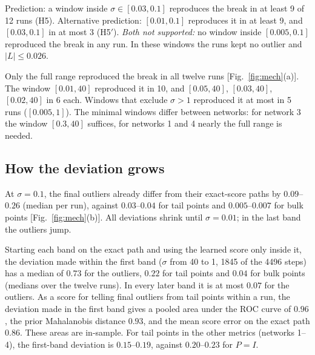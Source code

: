 \begin{test}
\label{test:h5}
Prediction: a window inside $\sigma\in[0.03,0.1]$ reproduces the break in at least 9 of 12 runs (H5).
Alternative prediction: $[0.01,0.1]$ reproduces it in at least 9, and $[0.03,0.1]$ in at most 3 (H5$'$).
\emph{Both not supported:} no window inside $[0.005,0.1]$ reproduced the break in any run.
In these windows the runs kept no outlier and $|L|\leq0.026$.
\end{test}

\begin{observation}
\label{obs:windows}
Only the full range reproduced the break in all twelve runs [Fig.~\ref{fig:mech}(a)].
The window $[0.01,40]$ reproduced it in 10, and $[0.05,40]$, $[0.03,40]$, $[0.02,40]$ in 6 each.
Windows that exclude $\sigma>1$ reproduced it at most in 5 runs ($[0.005,1]$).
The minimal windows differ between networks: for network 3 the window $[0.3,40]$ suffices, for networks 1 and 4 nearly the full range is needed.
\end{observation}

\subsection{How the deviation grows}

\begin{observation}
\label{obs:deviation}
At $\sigma=0.1$, the final outliers already differ from their exact-score paths by $0.09$--$0.26$ (median per run), against $0.03$--$0.04$ for tail points and $0.005$--$0.007$ for bulk points [Fig.~\ref{fig:mech}(b)].
All deviations shrink until $\sigma=0.01$; in the last band the outliers jump.
\end{observation}

\begin{observation}
\label{obs:bands}
Starting each band on the exact path and using the learned score only inside it, the deviation made within the first band ($\sigma$ from 40 to 1, 1845 of the 4496 steps) has a median of $0.73$ for the outliers, $0.22$ for tail points and $0.04$ for bulk points (medians over the twelve runs).
In every later band it is at most $0.07$ for the outliers.
As a score for telling final outliers from tail points within a run, the deviation made in the first band gives a pooled area under the ROC curve of $0.96$, the prior Mahalanobis distance $0.93$, and the mean score error on the exact path $0.86$.
These areas are in-sample.
For tail points in the other metrics (networks 1--4), the first-band deviation is $0.15$--$0.19$, against $0.20$--$0.23$ for $P=I$.
\end{observation}

